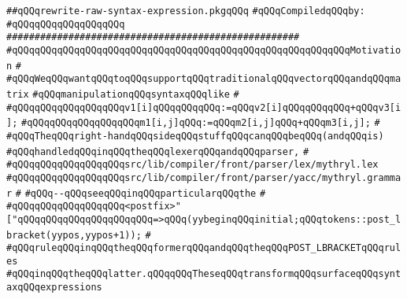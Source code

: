 \label{src/lib/compiler/front/typer/main/rewrite-raw-syntax-expression.pkg}
\verb|##qQQqrewrite-raw-syntax-expression.pkgqQQq|\newline
\newline
\verb|#qQQqCompiledqQQqby:|\newline
\verb|#qQQqqQQqqQQqqQQqqQQq|\newline
\newline
\verb|####################################################|\newline
\verb|#qQQqqQQqqQQqqQQqqQQqqQQqqQQqqQQqqQQqqQQqqQQqqQQqqQQqqQQqqQQqMotivation|\newline
\verb|#|\newline
\verb|#qQQqWeqQQqwantqQQqtoqQQqsupportqQQqtraditionalqQQqvectorqQQqandqQQqmatrix|\newline
\verb|#qQQqmanipulationqQQqsyntaxqQQqlike|\newline
\verb|#|\newline
\verb|#qQQqqQQqqQQqqQQqqQQqv1[i]qQQqqQQqqQQq:=qQQqv2[i]qQQqqQQqqQQq+qQQqv3[i];|\newline
\verb|#qQQqqQQqqQQqqQQqqQQqm1[i,j]qQQq:=qQQqm2[i,j]qQQq+qQQqm3[i,j];|\newline
\verb|#|\newline
\verb|#qQQqTheqQQqright-handqQQqsideqQQqstuffqQQqcanqQQqbeqQQq(andqQQqis)|\newline
\verb|#qQQqhandledqQQqinqQQqtheqQQqlexerqQQqandqQQqparser,|\newline
\verb|#|\newline
\verb|#qQQqqQQqqQQqqQQqqQQqsrc/lib/compiler/front/parser/lex/mythryl.lex|\newline
\verb|#qQQqqQQqqQQqqQQqqQQqsrc/lib/compiler/front/parser/yacc/mythryl.grammar|\newline
\verb|#|\newline
\verb|#qQQq--qQQqseeqQQqinqQQqparticularqQQqthe|\newline
\verb|#|\newline
\verb|#qQQqqQQqqQQqqQQqqQQq<postfix>"["qQQqqQQqqQQqqQQqqQQqqQQq=>qQQq(yybeginqQQqinitial;qQQqtokens::post_lbracket(yypos,yypos+1));|\newline
\verb|#|\newline
\verb|#qQQqruleqQQqinqQQqtheqQQqformerqQQqandqQQqtheqQQqPOST_LBRACKETqQQqrules|\newline
\verb|#qQQqinqQQqtheqQQqlatter.qQQqqQQqTheseqQQqtransformqQQqsurfaceqQQqsyntaxqQQqexpressions|\newline
